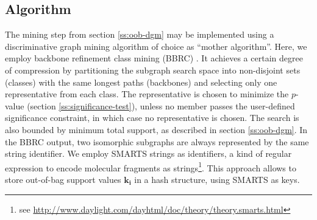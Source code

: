 \documentclass{sig-alternate}
\begin{document}
\subsection{Algorithm}
\label{s:Algorithm}
The mining step from section \ref{ss:oob-dgm} may be 
implemented using a discriminative graph mining algorithm of choice as ``mother algorithm''. Here, we
employ backbone refinement class mining (BBRC) \cite{maunz11efficient}. It
achieves a certain degree of compression by partitioning the subgraph search space into non-disjoint sets (classes) with the same
longest paths (backbones) and selecting only one representative from each
class. 
The representative is chosen to minimize the $p$-value (section \ref{ss:significance-test}), unless no member passes the user-defined significance constraint, in which case no representative is chosen.
The search is also bounded by minimum total support, as described in section \ref{ss:oob-dgm}.
In the BBRC output, two isomorphic subgraphs are always represented by the same string identifier.
We employ SMARTS strings as identifiers, a kind of regular expression to encode
molecular fragments as strings\footnote{see \url{http://www.daylight.com/dayhtml/doc/theory/theory.smarts.html}}.  This approach allows to store out-of-bag support values $\mathbf{k_i}$ in a
hash structure, using SMARTS as keys. 
\end{document}
